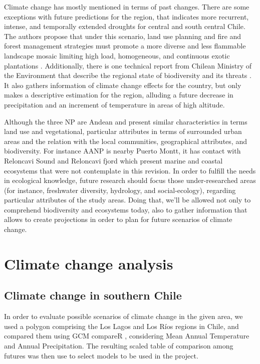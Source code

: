 \documentclass[]{article}
\begin{document}
Climate change has mostly mentioned in terms of past changes. There are some exceptions with future predictions for the region, that indicates more recurrent, intense, and temporally extended droughts for central and south central Chile. The authors propose that under this scenario, land use planning and fire and forest management strategies must promote a more diverse and less flammable landscape mosaic limiting high load, homogeneous, and continuous exotic plantations \citep{Gonzalez2018Mega}. Additionally, there is one technical report from Chilean Ministry of the Environment that describe the regional state of biodiversity and its threats \citep{MMA2016diagnostico}. It also gathers information of climate change effects for the country, but only makes a descriptive estimation for the region,
alluding a future decrease in precipitation and an increment of temperature in areas of high altitude.

Although the three NP are Andean and present similar characteristics in terms land use and vegetational, particular attributes in terms of surrounded urban areas and the relation with the local communities, geographical attributes, and biodiversity.
For instance AANP is nearby Puerto Montt, it has contact with Reloncavi Sound and Reloncavi fjord which present marine and coastal ecosystems that were not contemplate in this revision.
In order to fulfill the needs in ecological knowledge, future research should focus those under-researched areas (for instance, freshwater diversity, hydrology, and social-ecology), regarding particular attributes of the study areas.
Doing that, we'll be allowed not only to comprehend biodiversity and ecosystems today, also to gather information that allows to create projections in order to plan for future scenarios of climate change.

\hypertarget{climate-change-analysis}{%
\section{Climate change analysis}\label{climate-change-analysis}}

\hypertarget{climate-change-in-southern-chile}{%
\subsection{Climate change in southern Chile}\label{climate-change-in-southern-chile}}

In order to evaluate possible scenarios of climate change in the given area, we used a polygon comprising the Los Lagos and Los Ríos regions in Chile, and compared them using GCM compareR \citep{fajardo2020gcm}, considering Mean Annual Temperature and Annual Precipitation. The resulting scaled table of comparison among futures was then use to select models to be used in the project.
\end{document}
